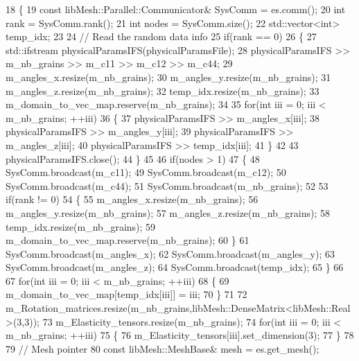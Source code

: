 \begin{DoxyCode}
18 \{
19     \textcolor{keyword}{const} libMesh::Parallel::Communicator& SysComm = es.comm();
20     \textcolor{keywordtype}{int} rank = SysComm.rank();
21     \textcolor{keywordtype}{int} nodes = SysComm.size();
22     std::vector<int> temp\_idx;
23 
24     \textcolor{comment}{// Read the random data info}
25     \textcolor{keywordflow}{if}(rank == 0)
26     \{
27         std::ifstream physicalParamsIFS(physicalParamsFile);
28         physicalParamsIFS >> m\_nb\_grains >> m\_c11 >> m\_c12 >> m\_c44;
29         m\_angles\_x.resize(m\_nb\_grains);
30         m\_angles\_y.resize(m\_nb\_grains);
31         m\_angles\_z.resize(m\_nb\_grains);
32         temp\_idx.resize(m\_nb\_grains);
33         m\_domain\_to\_vec\_map.reserve(m\_nb\_grains);
34 
35         \textcolor{keywordflow}{for}(\textcolor{keywordtype}{int} iii = 0; iii < m\_nb\_grains; ++iii)
36         \{
37             physicalParamsIFS >> m\_angles\_x[iii];
38             physicalParamsIFS >> m\_angles\_y[iii];
39             physicalParamsIFS >> m\_angles\_z[iii];
40             physicalParamsIFS >> temp\_idx[iii];
41         \}
42 
43         physicalParamsIFS.close();
44     \}
45 
46     \textcolor{keywordflow}{if}(nodes > 1)
47     \{
48         SysComm.broadcast(m\_c11);
49         SysComm.broadcast(m\_c12);
50         SysComm.broadcast(m\_c44);
51         SysComm.broadcast(m\_nb\_grains);
52 
53         \textcolor{keywordflow}{if}(rank != 0)
54         \{
55             m\_angles\_x.resize(m\_nb\_grains);
56             m\_angles\_y.resize(m\_nb\_grains);
57             m\_angles\_z.resize(m\_nb\_grains);
58             temp\_idx.resize(m\_nb\_grains);
59             m\_domain\_to\_vec\_map.reserve(m\_nb\_grains);
60         \}
61         SysComm.broadcast(m\_angles\_x);
62         SysComm.broadcast(m\_angles\_y);
63         SysComm.broadcast(m\_angles\_z);
64         SysComm.broadcast(temp\_idx);
65     \}
66 
67     \textcolor{keywordflow}{for}(\textcolor{keywordtype}{int} iii = 0; iii < m\_nb\_grains; ++iii)
68     \{
69         m\_domain\_to\_vec\_map[temp\_idx[iii]] = iii;
70     \}
71 
72     m\_Rotation\_matrices.resize(m\_nb\_grains,libMesh::DenseMatrix<libMesh::Real>(3,3));
73     m\_Elasticity\_tensors.resize(m\_nb\_grains);
74     \textcolor{keywordflow}{for}(\textcolor{keywordtype}{int} iii = 0; iii < m\_nb\_grains; ++iii)
75     \{
76         m\_Elasticity\_tensors[iii].set\_dimension(3);
77     \}
78 
79     \textcolor{comment}{// Mesh pointer}
80     \textcolor{keyword}{const} libMesh::MeshBase& mesh = es.get\_mesh();

\end{DoxyCode}
